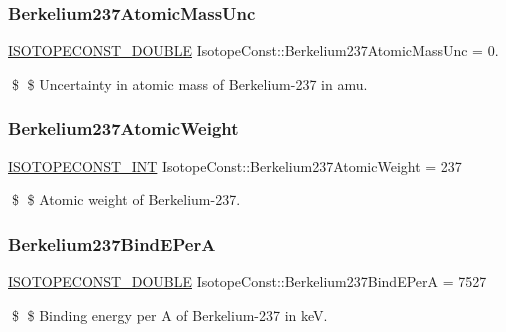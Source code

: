\subsubsection{\texorpdfstring{Berkelium237\+Atomic\+Mass\+Unc}{Berkelium237AtomicMassUnc}}
{\footnotesize\ttfamily \mbox{\hyperlink{group___isotope_const-_macros_ga8f45a7272ce02c0b4c65c44636ed719a}{I\+S\+O\+T\+O\+P\+E\+C\+O\+N\+S\+T\+\_\+\+D\+O\+U\+B\+LE}} Isotope\+Const\+::\+Berkelium237\+Atomic\+Mass\+Unc = 0.}

\$ \$ Uncertainty in atomic mass of Berkelium-\/237 in amu. \mbox{\label{group___isotope_const-_berkelium-_bk237_ga5a668f442bee476a015ca5ce9e49564a}} 
\subsubsection{\texorpdfstring{Berkelium237\+Atomic\+Weight}{Berkelium237AtomicWeight}}
{\footnotesize\ttfamily \mbox{\hyperlink{group___isotope_const-_macros_ga5f18360b3e99483a35c32d789e62621c}{I\+S\+O\+T\+O\+P\+E\+C\+O\+N\+S\+T\+\_\+\+I\+NT}} Isotope\+Const\+::\+Berkelium237\+Atomic\+Weight = 237}

\$ \$ Atomic weight of Berkelium-\/237. \mbox{\label{group___isotope_const-_berkelium-_bk237_gac90ee2c9502fab459003f0cda3715ef3}} 
\subsubsection{\texorpdfstring{Berkelium237\+Bind\+E\+PerA}{Berkelium237BindEPerA}}
{\footnotesize\ttfamily \mbox{\hyperlink{group___isotope_const-_macros_ga8f45a7272ce02c0b4c65c44636ed719a}{I\+S\+O\+T\+O\+P\+E\+C\+O\+N\+S\+T\+\_\+\+D\+O\+U\+B\+LE}} Isotope\+Const\+::\+Berkelium237\+Bind\+E\+PerA = 7527}

\$ \$ Binding energy per A of Berkelium-\/237 in keV. \mbox{\label{group___isotope_const-_berkelium-_bk237_ga5ef39222d4a4b0b581ccd624ea06e32a}} 
